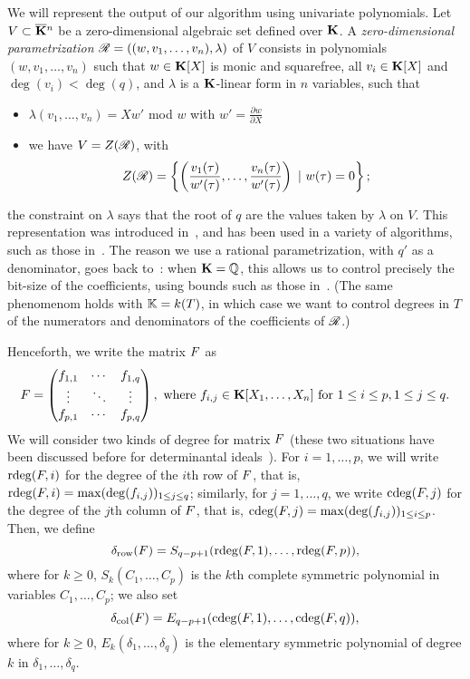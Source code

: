 \documentclass[12pt]{article}
\begin{document}
We will represent the output of our algorithm using univariate
polynomials. Let $V \subset \overline{\mathbf{K}}{}^n$ be a zero-dimensional algebraic
set defined over $\mathbf{K}$. A \emph{zero-dimensional parametrization}
$\mathscr{R} = ((w,v_1, \ldots, v_n), \lambda)$ of $V$ consists in
polynomials $(w,v_1, \ldots, v_n)$ such that $w \in \mathbf{K}[X]$ is monic
and squarefree, all $v_i \in \mathbf{K}[X]$ and $\deg(v_i) < \deg(q)$, and
$\lambda$ is a $\mathbf{K}$-linear form in $n$ variables, such that
\begin{itemize}
\item $\lambda(v_1, \ldots, v_n) = Xw'$ mod $w$ with $w'=\frac{\partial w}{\partial X}$
\item we have $V = Z(\mathscr{R})$, with $$Z(\mathscr{R})= \left\{\left(\frac{v_1(\tau)}{w'(\tau)}, \ldots, \frac{v_n(\tau)}{w'(\tau)}\right) \ | \ w(\tau) = 0\right\};$$
\end{itemize}
the constraint on $\lambda$ says that the root of $q$ are the values
taken by $\lambda$ on $V$. This representation was introduced
in~\cite{Kronecker82,Macaulay16}, and has been used in a variety of
algorithms, such
as those in~\cite{GiMo89,GiHeMoPa95,ABRW,GiHeMoMoPa98,Rouillier99,GiLeSa01}.
The reason we use a rational parametrization, with $q'$ as a
denominator, goes back to~\cite{ABRW, Rouillier99, GiLeSa01}: when
$\mathbf{K}=\mathbb{Q}$, this allows us to control precisely the bit-size of the
coefficients, using bounds such as those
in~\cite{Schost03,DaSc04}. (The same phenomenom holds with $\mathbb{K}=k(T)$,
in which case we want to control degrees in $T$ of the numerators and
denominators of the coefficients of $\mathscr{R}$.)


Henceforth, we write the matrix ${F}$ as 
\[ {F} = 
\left( \begin{matrix}
f_{1,1} & \cdots & f_{1,q}\\
\vdots & \ddots & \vdots \\
f_{p,1} & \cdots & f_{p,q}
\end{matrix} \right), \ \mathrm{where} \ f_{i,j} \in \mathbf{K}[X_1,\dots,X_n] \ \mathrm{for} \ 1 \leq i \leq p, 1 \leq j \leq q.
\]
We will consider two kinds of degree for matrix ${F}$ (these two
situations have been discussed before for determinantal
ideals~\cite{NieRan09,MiSt04}). For $i=1,\dots,p$, we will write $\mathrm{rdeg}({F},i)$ for the
degree of the $i$th row of ${F}$, that is,
$\mathrm{rdeg}({F},i)=\max(\deg(f_{i,j}))_{1 \le j \le q}$; similarly, for $j=1,\dots,q$, we write
$\mathrm{cdeg}({F},j)$ for the degree of the $j$th column of ${F}$, that is,
$\mathrm{cdeg}({F},j)=\max(\deg(f_{i,j}))_{1 \le i \le p}$. Then, we define
$$\delta_{\rm row}({F}) = S_{q-p+1}(\mathrm{rdeg}({F},1), \ldots, \mathrm{rdeg}({F},p)),$$
where for $k\ge 0$, $S_k(C_1,\dots,C_p)$ is the $k$th complete symmetric
polynomial in variables $C_1,\dots,C_p$; we also set 
$$\delta_{\rm col}({F}) = E_{q-p+1}(\mathrm{cdeg}({F},1), \ldots, \mathrm{cdeg}({F},q)),$$
where for $k \ge 0$, $E_k(\delta_1,\dots,\delta_q)$ is the 
elementary symmetric polynomial of degree $k$ in $\delta_1, \ldots, \delta_q$.
\end{document}
